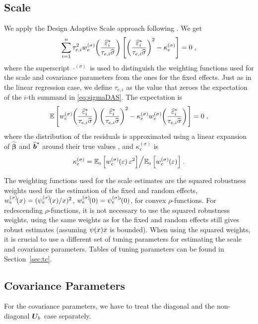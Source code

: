 \documentclass[11pt, a4paper]{article}
\renewcommand{\widetilde}{\widehat}
\newcommand{\fn}[1]{\kern-1pt\left(#1\right)\kern+0.5pt}
\newcommand{\fns}[1]{\kern-0.5pt(#1)}
\newcommand{\bld}[1]{\boldsymbol{#1}}
\renewcommand{\vec}[1]{\bld{#1}}
\newcommand{\tv}[2][]{{\widetilde{\vec{#2}}_{#1}}}
\newcommand{\s}[1][\rho]{#1^{(\sigma)}}
\newcommand{\si}[2][w]{#1^{(\sigma)}_{#2}\kern-1pt}
\newcommand{\tvbs}{\widetilde{\vec{b}}^{\raisebox{-0.75ex}{\scriptsize *}}}
\newcommand{\hes}{\widehat{\varepsilon}^{*}}
\newcommand{\U}[2][-0.15ex]{\bld{U}_{\hspace{#1}#2\hspace{0.25ex}}}
\newcommand{\Ub}{\U{b}}
\newcommand{\ERWSymbol}{\mathbb{E}}
\newcommand{\makeright}[2]{\ifx#1\left\right#2\else#1#2\fi}
\newcommand{\Xsub}[2]{{#1}_{\mathrm{\scriptscriptstyle #2}}}
\newcommand{\ERW}[2][\left] {\ERWSymbol    #1[ #2 \makeright{#1}{]}}
\newcommand{\ERWi}[3][\left] {\Xsub{\ERWSymbol}{#2}    #1[ #3
    \makeright{#1}{]}}
\theoremstyle{note}
\begin{document}
\subsection{Scale}
We apply the Design Adaptive Scale approach following \citet{ks2011}. We get
\begin{equation}
  \label{eq:sigmaDAS}
  \sum_{i=1}^n\tau_{e,i}^2\si{e}\fn{\frac{\hes_i}{\tau_{e,i}\widehat\sigma}}
  \left[
    \left(\frac{\hes_i}{\tau_{e,i}\widehat\sigma}\right)^2 - \s[\kappa]_e
  \right] = 0\;,
\end{equation}
where the superscript $\s[\cdot]$ is used to distinguish the weighting
functions used for the scale and covariance parameters from the ones for the
fixed effects. Just as in the linear regression case, we define
$\tau_{e,i}$ as the value that zeroes the expectation of the $i$-th summand
in \eqref{eq:sigmaDAS}. The expectation is
\begin{equation}
  \label{eq:tau_ei}
  \ERW{\si{e}\fn{\frac{\hes_i}{\tau_{e,i}\widehat\sigma}}
    \left(\frac{\hes_i}{\tau_{e,i}\widehat\sigma}\right)^2 -
    \s[\kappa]_e \si{e}\fn{\frac{\hes_i}{\tau_{e,i}\widehat\sigma}}} = 0\;,
\end{equation}
where the distribution of the residuals is approximated using a linear
expansion of $\tv\beta$ and $\tvbs$ around their true values
\citep[Appendix~C]{koller2013}, and $\s[\kappa]_e$ is
\begin{equation*}
  \s[\kappa]_e =
  {\ERWi{0}{\si{e}\fn{\varepsilon}\varepsilon^2}}\Big/
  {\ERWi{0}{\si{e}\fn{\varepsilon}}}\;.
\end{equation*}

The weighting functions used for the scale estimates are the squared
robustness weights used for the estimation of the fixed and random effects,
$\si{e}\fns{x} = (\si[\psi]{e}\fns{x}/x)^2$, $\si{e}\fns{0} =
\si[\psi]{e}'\fns{0}$, for convex $\rho$-functions. For redescending
$\rho$-functions, it is not necessary to use the squared robustness
weights, using the same weights as for the fixed and random effects still
gives robust estimates (assuming $\psi\fns{x}x$ is bounded). When using the
squared weights, it is crucial to use a different set of tuning parameters
for estimating the scale and covariance parameters. Tables of tuning
parameters can be found in Section~\ref{sec:tc}.

\subsection{Covariance Parameters}
For the covariance parameters, we have to treat the diagonal and the
non-diagonal $\Ub$ case separately.
\end{document}
